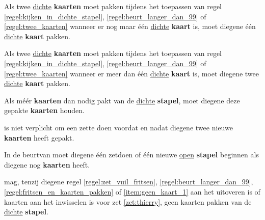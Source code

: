 \vervolgLijst{}
\item Als \eenSpeler twee \ul{dichte} \textbf{kaarten} moet pakken tijdens het toepassen van regel \ref{regel:kijken_in_dichte_stapel}, \ref{regel:beurt_langer_dan_99} of \ref{regel:twee_kaarten} wanneer er nog maar \'e\'en \ul{dichte} \textbf{kaart} is, moet diegene \'e\'en \ul{dichte} \textbf{kaart} pakken.
\label{item:geen_kaart_2}
\eindLijst{}

\vervolgLijst{}
\item Als \eenSpeler twee \ul{dichte} \textbf{kaarten} moet pakken tijdens het toepassen van regel \ref{regel:kijken_in_dichte_stapel}, \ref{regel:beurt_langer_dan_99} of \ref{regel:twee_kaarten} wanneer er meer dan \'e\'en \ul{dichte} \textbf{kaart} is, moet diegene twee \ul{dichte} \textbf{kaart} pakken.
\label{item:geen_kaart_3}
\eindLijst{}

\vervolgLijst{}
\item Als \eenSpeler méér \textbf{kaarten} dan nodig pakt van de \ul{dichte} \textbf{stapel}, moet diegene deze gepakte \textbf{kaarten} houden.
\eindLijst{}

\vervolgLijst{}
\item \EenSpeler is niet verplicht om een zet\footnotemark[3] te doen voordat en nadat diegene twee nieuwe \textbf{kaarten} heeft gepakt.
\eindLijst{}

\vervolgLijst{}
\item In de beurt\footnotemark[1] van \eenSpeler moet diegene \'e\'en zet\footnotemark[3] doen of \'e\'en nieuwe \ul{open} \textbf{stapel} beginnen als diegene nog \textbf{kaarten} heeft.
\eindLijst{}


\newpage
{}


\vervolgLijst{}
\item \EenSpeler mag, tenzij diegene regel \ref{regel:zet_vuil_fritsen}, \ref{regel:beurt_langer_dan_99}, \ref{regel:fritsen_en_kaarten_pakken} of \ref{item:geen_kaart_1} aan het uitoveren is of kaarten aan het inwisselen is voor zet \ref{zet:thierry}, geen kaarten pakken van de \ul{dichte} \textbf{stapel}.
\label{regel:kaart_pakken_buiten_beurt}
\eindLijst{}

